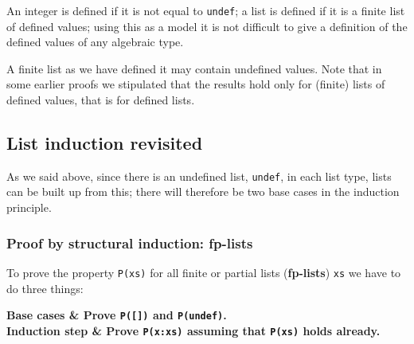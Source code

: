 An integer is defined 
if it is not equal to \texttt{undef}; a list is defined 
if it
is a finite list of defined values; using this as a model it is not
difficult to give a definition of the defined values of any algebraic type. 
 
A
finite list as we have defined it may contain undefined values. Note that in
some earlier proofs we stipulated that the results hold only for (finite)
lists of defined values, that is for defined lists.



\subsection*{List induction revisited}

As we said above, since there is an undefined list, \texttt{undef}, in each list
type, lists can be built up from this; there will therefore be two base
cases in the induction principle.

\subsubsection*{Proof by structural induction: fp-lists} 

To prove the property \texttt{P(xs)} for all finite or partial lists
(\textbf{fp-lists}) \texttt{xs} we have to do three things:

\medskip
\noindent
\begin{mytable}
\bf Base cases & Prove \texttt{P([])} and \texttt{P(undef)}. \\
\bf Induction step & Prove \texttt{P(x:xs)} assuming that \texttt{P(xs)} holds
already.
\end{mytable}

